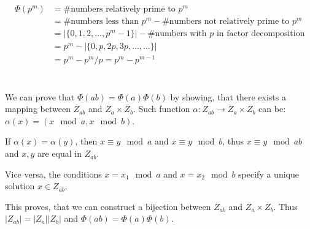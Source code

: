\documentclass[a4paper]{article}
\begin{document}
\thispagestyle{fancy} %
{}

\section{}

\begin{align*}
	\Phi(p^m)
	& = \#\text{numbers relatively prime to } p^m \\
	& = \#\text{numbers less than } p^m - \#\text{numbers not relatively prime to } p^m \\
	& = |\{0, 1, 2, \ldots, p^m-1\}| - \#\text{numbers with $p$ in factor decomposition} \\
	& = p^m - |\{0, p, 2p, 3p, \ldots, \ldots\}| \\
	& = p^m - p^m/p = p^m - p^{m-1}
\end{align*}

\section{}

We can prove that $\Phi(ab) = \Phi(a)\Phi(b)$ by showing, that there exists a mapping between $Z_{ab}$ and $Z_a \times Z_b$. Such function $\alpha: Z_{ab} \rightarrow Z_a \times Z_b $ can be: $\alpha(x) = (x \mod a, x \mod b)$.

If $\alpha(x) = \alpha(y)$, then $x \equiv y \mod a$ and $x \equiv y \mod b$, thus $x \equiv y \mod ab$ and $x, y$ are equal in $Z_{ab}$.

Vice versa, the conditions $x = x_1 \mod a$ and $x = x_2 \mod b$ specify a unique solution $x \in Z_{ab}$.

This proves, that we can construct a bijection between $Z_{ab}$ and $Z_a \times Z_b$. Thus $|Z_{ab}| = |Z_a||Z_b|$ and $\Phi(ab) = \Phi(a)\Phi(b)$.
\end{document}
